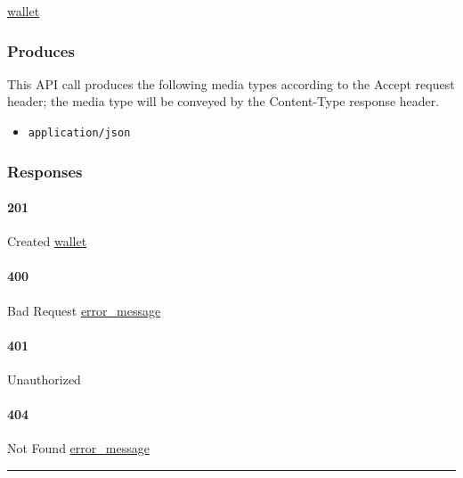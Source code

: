 \protect\hyperlink{wallet}{wallet}

\hypertarget{produces-184}{%
\subsubsection{Produces}\label{produces-184}}

This API call produces the following media types according to the
{Accept} request header; the media type will be conveyed by the
{Content-Type} response header.

\begin{itemize}
\tightlist
\item
  \texttt{application/json}
\end{itemize}

\hypertarget{responses-190}{%
\subsubsection{Responses}\label{responses-190}}

\hypertarget{section-612}{%
\paragraph{201}\label{section-612}}

Created \protect\hyperlink{wallet}{wallet}

\hypertarget{section-613}{%
\paragraph{400}\label{section-613}}

Bad Request \protect\hyperlink{error_message}{error\_message}

\hypertarget{section-614}{%
\paragraph{401}\label{section-614}}

Unauthorized \protect\hyperlink{}{}

\hypertarget{section-615}{%
\paragraph{404}\label{section-615}}

Not Found \protect\hyperlink{error_message}{error\_message}

\begin{center}\rule{0.5\linewidth}{\linethickness}\end{center}

